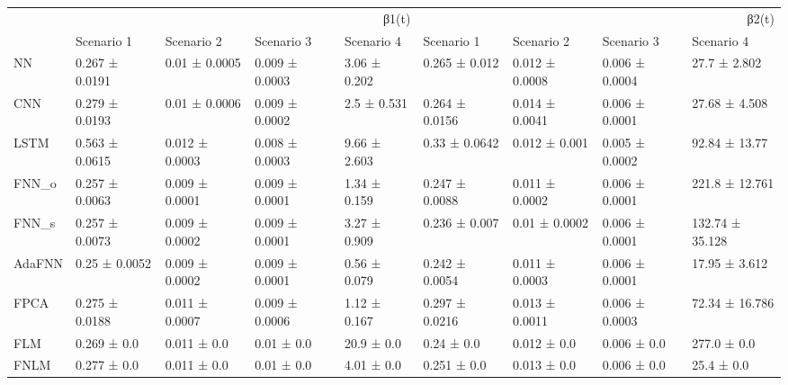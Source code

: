 \begin{tabular}{lllllllll}
\toprule
 & \multicolumn{4}{r}{β1(t)} & \multicolumn{4}{r}{β2(t)} \\
 & Scenario 1 & Scenario 2 & Scenario 3 & Scenario 4 & Scenario 1 & Scenario 2 & Scenario 3 & Scenario 4 \\
\midrule
NN & 0.267 ± 0.0191 & 0.01 ± 0.0005 & 0.009 ± 0.0003 & 3.06 ± 0.202 & 0.265 ± 0.012 & 0.012 ± 0.0008 & 0.006 ± 0.0004 & 27.7 ± 2.802 \\
CNN & 0.279 ± 0.0193 & 0.01 ± 0.0006 & 0.009 ± 0.0002 & 2.5 ± 0.531 & 0.264 ± 0.0156 & 0.014 ± 0.0041 & 0.006 ± 0.0001 & 27.68 ± 4.508 \\
LSTM & 0.563 ± 0.0615 & 0.012 ± 0.0003 & 0.008 ± 0.0003 & 9.66 ± 2.603 & 0.33 ± 0.0642 & 0.012 ± 0.001 & 0.005 ± 0.0002 & 92.84 ± 13.77 \\
FNN_o & 0.257 ± 0.0063 & 0.009 ± 0.0001 & 0.009 ± 0.0001 & 1.34 ± 0.159 & 0.247 ± 0.0088 & 0.011 ± 0.0002 & 0.006 ± 0.0001 & 221.8 ± 12.761 \\
FNN_s & 0.257 ± 0.0073 & 0.009 ± 0.0002 & 0.009 ± 0.0001 & 3.27 ± 0.909 & 0.236 ± 0.007 & 0.01 ± 0.0002 & 0.006 ± 0.0001 & 132.74 ± 35.128 \\
AdaFNN & 0.25 ± 0.0052 & 0.009 ± 0.0002 & 0.009 ± 0.0001 & 0.56 ± 0.079 & 0.242 ± 0.0054 & 0.011 ± 0.0003 & 0.006 ± 0.0001 & 17.95 ± 3.612 \\
FPCA & 0.275 ± 0.0188 & 0.011 ± 0.0007 & 0.009 ± 0.0006 & 1.12 ± 0.167 & 0.297 ± 0.0216 & 0.013 ± 0.0011 & 0.006 ± 0.0003 & 72.34 ± 16.786 \\
FLM & 0.269 ± 0.0 & 0.011 ± 0.0 & 0.01 ± 0.0 & 20.9 ± 0.0 & 0.24 ± 0.0 & 0.012 ± 0.0 & 0.006 ± 0.0 & 277.0 ± 0.0 \\
FNLM & 0.277 ± 0.0 & 0.011 ± 0.0 & 0.01 ± 0.0 & 4.01 ± 0.0 & 0.251 ± 0.0 & 0.013 ± 0.0 & 0.006 ± 0.0 & 25.4 ± 0.0 \\
\bottomrule
\end{tabular}
